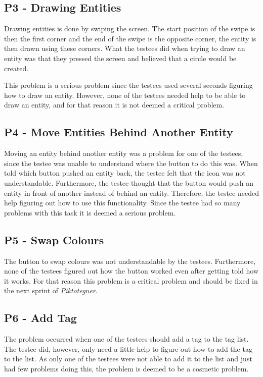 \subsection*{P3 - Drawing Entities}
Drawing entities is done by swiping the screen.
The start position of the swipe is then the first corner and the end of the swipe is the opposite corner, the entity is then drawn using these corners.
What the testees did when trying to draw an entity was that they pressed the screen and believed that a circle would be created.

This problem is a serious problem since the testees used several seconds figuring how to draw an entity.
However, none of the testees needed help to be able to draw an entity, and for that reason it is not deemed a critical problem.

\subsection*{P4 - Move Entities Behind Another Entity}
Moving an entity behind another entity was a problem for one of the testees, since the testee was unable to understand where the button to do this was.
When told which button pushed an entity back, the testee felt that the icon was not understandable.
Furthermore, the testee thought that the button would push an entity in front of another instead of behind an entity.
Therefore, the testee needed help figuring out how to use this functionality.
Since the testee had so many problems with this task it is deemed a serious problem.

\subsection*{P5 - Swap Colours}
The button to swap colours was not understandable by the testees.
Furthermore, none of the testees figured out how the button worked even after getting told how it works.
For that reason this problem is a critical problem and should be fixed in the next sprint of \textit{Piktotegner}.

\subsection*{P6 - Add Tag}
The problem occurred when one of the testees should add a tag to the tag list.
The testee did, however, only need a little help to figure out how to add the tag to the list.
As only one of the testees were not able to add it to the list and just had few problems doing this, the problem is deemed to be a cosmetic problem.

